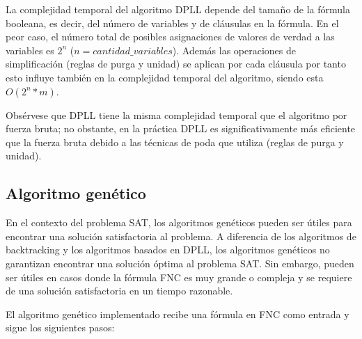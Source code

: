 \documentclass{article}
\begin{document}
                La complejidad temporal del algoritmo DPLL depende del tamaño de la fórmula booleana, es decir, del 
                número de variables y de cláusulas en la fórmula. En el peor caso, el número total de posibles asignaciones de 
                valores de verdad a las variables es $2^n$ ($n=cantidad\_variables$). Además las operaciones de simplificación
                (reglas de purga y unidad) se aplican por cada cláusula por tanto esto influye también en la complejidad temporal
                del algoritmo, siendo esta $O(2^n*m)$.

                Obsérvese que DPLL tiene la misma complejidad temporal que el algoritmo por fuerza bruta; no obstante, en la práctica 
                DPLL es significativamente más eficiente que la fuerza bruta debido a las técnicas de poda que utiliza (reglas de purga y unidad).
    
    \subsection*{Algoritmo genético}
        
        En el contexto del problema SAT, los algoritmos genéticos pueden ser útiles para encontrar
        una solución satisfactoria al problema. A diferencia de los algoritmos de backtracking y los algoritmos
        basados en DPLL, los algoritmos genéticos no garantizan encontrar una solución óptima 
        al problema SAT. Sin embargo, pueden ser útiles en casos donde la fórmula FNC es muy grande o compleja
        y se requiere de una solución satisfactoria en un tiempo razonable.

        El algoritmo genético implementado recibe una fórmula en FNC como entrada y sigue los siguientes pasos:
\end{document}
